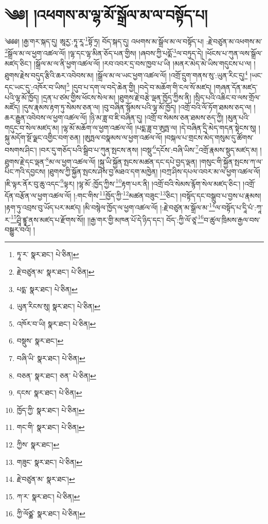 \setcounter{footnote}{0} 
\chapter{༄༅། །འཕགས་མ་ལྷ་མོ་སྒྲོལ་མ་ལ་བསྟོད་པ།}༄༅༅། །རྒྱ་གར་སྐད་དུ། ཨཱརྱ་:ཏཱ་རཱ་\footnote{ཏཱ་ར་  སྣར་ཐང་།  པེ་ཅིན། }སྟོ་ཏྲ། བོད་སྐད་དུ། འཕགས་མ་སྒྲོལ་མ་ལ་བསྟོད་པ། :རྗེ་བཙུན་མ་འཕགས་མ་\footnote{རྗེ་བཙུན་མ་  སྣར་ཐང་།  པེ་ཅིན། }སྒྲོལ་མ་ལ་ཕྱག་འཚལ་ལོ། །ལྷ་དང་ལྷ་མིན་ཅོད་པན་གྱིས། །ཞབས་ཀྱི་པདྨོ་\footnote{པདྨ་  སྣར་ཐང་།  པེ་ཅིན། }ལ་བཏུད་དེ། །ཕོངས་པ་ཀུན་ལས་སྒྲོལ་མཛད་ཅིང་། །སྒྲོལ་མ་ལ་ནི་ཕྱག་འཚལ་ལོ། །རབ་འབར་དྲ་བས་ཁྱབ་པ་ཡི། །མནར་མེད་མེ་ཡིས་གདུངས་པ་ལ། །ཐུགས་རྗེས་བདུད་རྩིའི་ཆར་འབེབས་མ། །སྒྲོལ་མ་ལ་ཡང་ཕྱག་འཚལ་ལོ། །འགྲོ་དྲུག་གནས་སུ་:ཡུན་རིང་དུ།\footnote{ཡུན་རིངས་སུ།  སྣར་ཐང་།  པེ་ཅིན། } །ཡང་དང་ཡང་དུ་:འཁོར་བ་ཡིས།\footnote{འཁོར་བ་ཡི།  སྣར་ཐང་།  པེ་ཅིན། } །དུབ་པ་དག་ལ་བདེ་ཆེན་གྱི། །བདེ་བ་མཆོག་གི་ངལ་སོ་མཛད། །གཞན་དོན་མཛད་པའི་ལྷ་མོ་ཁྱོད། །དྲན་པ་ཙམ་གྱིས་ཕོངས་སེལ་མ། །ཐུགས་རྗེ་བརྩེ་ལྡན་ཁྱོད་ཀྱིས་ནི། །སྲིད་པའི་འཆིང་བ་ལས་གྲོལ་མཛོད། །དུས་རྣམས་རྟག་ཏུ་སེམས་ཅན་ལ། །བུ་བཞིན་སྙོམས་པའི་ལྷ་མོ་ཁྱོད། །འགྲོ་བའི་ལོ་ཏོག་ཐམས་ཅད་ལ། །ཆར་རྒྱུན་འབེབས་ལ་ཕྱག་འཚལ་ལོ། །ཉི་མ་ཟླ་བ་ཇི་བཞིན་དུ། །འགྲོ་བ་སེམས་ཅན་ཐམས་ཅད་ཀྱི། །མུན་པའི་གདུང་བ་སེལ་མཛད་མ། །ལྷ་མོ་མཆོག་ལ་ཕྱག་འཚལ་ལོ། །པདྨ་ཟླ་བ་ཨུཏྤ་ལ། །དེ་བཞིན་དྲི་མེད་གདན་སྟེངས་སུ། །སྐུ་མདོག་སྔོ་ལྗང་འགྱིང་བག་ཅན། །ཨུཏྤལ་བསྣམས་ལ་ཕྱག་འཚལ་ལོ། །བསྐལ་པ་གྲངས་མེད་གསུམ་དུ་ཚོགས་བསགས་ཤིང་། །བར་དུ་གཅོད་པའི་སྒྲིབ་པ་ཀུན་སྤངས་ནས། །བསྡུ་\footnote{བསྡུས་  སྣར་ཐང་། }དངོས་:བཞི་ཡིས་\footnote{བཞི་ཡི་  སྣར་ཐང་།  པེ་ཅིན། }འགྲོ་རྣམས་སྡུད་མཛད་མ། །ཐུགས་རྗེ་དང་ལྡན་\footnote{བཅན་  སྣར་ཐང་། ཅན་  པེ་ཅིན། }མ་ལ་ཕྱག་འཚལ་ལོ། །སྐུ་ཡི་སྐྱོན་སྤངས་མཚན་དང་དཔེ་བྱད་ལྡན། །གསུང་གི་སྐྱོན་སྤངས་ཀ་ལ་པིང་ཀའི་དབྱངས། །ཐུགས་ཀྱི་སྐྱོན་སྤངས་ཤེས་བྱ་མཐའ་དག་མཁྱེན། །བཀྲ་ཤིས་དཔལ་འབར་མ་ལ་ཕྱག་འཚལ་ལོ། །ཇི་ལྟར་ནོར་བུ་ཆུ་འདང་\footnote{དངས་  སྣར་ཐང་།  པེ་ཅིན། }ལྟར། །ལྷ་མོ་:ཁྱོད་ཀྱིས་\footnote{ཁྱོད་ཀྱི་  སྣར་ཐང་།  པེ་ཅིན། }རྟག་པར་ནི། །འགྲོ་བའི་སེམས་རྙོག་སེལ་མཛད་ཅིང་། །འགྲོ་དོན་བརྩོན་ལ་ཕྱག་འཚལ་ལོ། །:གང་གིས་\footnote{གང་གི་  སྣར་ཐང་།  པེ་ཅིན། }ཁྱོད་ཀྱི་\footnote{ཀྱིས་  སྣར་ཐང་། }མཚན་བཟུང་\footnote{གཟུང་  སྣར་ཐང་།  པེ་ཅིན། }ཅིང་། །བསྟོད་དང་བསྒྲུབ་པ་བྱས་པ་རྣམས། །རྟག་ཏུ་འབྲས་བུ་ཡོད་པར་མཛད། །མི་བསྙེལ་ཁྱོད་ལ་ཕྱག་འཚལ་ལོ། །:རྗེ་བཙུན་མ་སྒྲོལ་མ་\footnote{རྗེ་བཙུན་མ་  སྣར་ཐང་། }ལ་བསྟོད་པ་དཱི་པཾ་:ཀཱ་ར་\footnote{ཀ་ར་  སྣར་ཐང་།  པེ་ཅིན། }ཤྲཱི་ཛྙཱ་ནས་མཛད་པ་རྫོགས་སོ།། །།རྒྱ་གར་གྱི་མཁན་པོ་དེ་ཉིད་དང་། བོད་:ཀྱི་ལོ་ཙཱ་\footnote{ཀྱི་ལོཙྪ་  སྣར་ཐང་།  པེ་ཅིན། }བ་ཚུལ་ཁྲིམས་རྒྱལ་བས་བསྒྱུར་བའོ། ། 